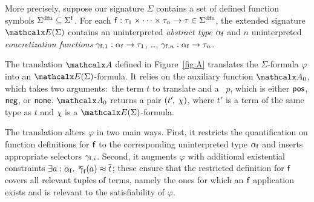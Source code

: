 More precisely,
suppose our signature $\Sigma$ contains a set of defined function symbols $\sfundefs{\Sigma} \subseteq \sfuns{\Sigma}$.
For each $\con{f} : \tau_1 \times \cdots \times \tau_n \rightarrow \tau \in \sfundefs{\Sigma}$,
the extended signature $\extendsig{\Sigma}$ contains
an uninterpreted \emph{abstract type} $\alpha_{\mathsf{f}}$ and
$n$ uninterpreted \emph{concretization functions} $\gamma_{\mathsf{f},1} : \alpha_{\mathsf{f}} \rightarrow \tau_1$, \ldots, $\gamma_{\mathsf{f},n} : \alpha_{\mathsf{f}} \rightarrow \tau_n$.

The translation $\conv$ defined in Figure~\ref{fig:A} translates the $\Sigma$-formula
$\varphi$ into an $\extendsig{\Sigma}$-formula. It relies
on the auxiliary function $\conv_0$, which takes two arguments:\ the term $t$
to translate and a ~$p$, which is either $\mathsf{pos}$, $\mathsf{neg}$, or
$\mathsf{none}$. \vthinspace$\conv_0$ returns a pair $( t'\negvthinspace,\, \chi )$, where $t'$ is a term of
the same type as $t$ and $\chi$ is a $\extendsig{\Sigma}$-formula.



The translation alters $\varphi$ in two main ways. First, it restricts the
quantification on function definitions for $\mathsf{f}$ to the corresponding
uninterpreted type $\alpha_{\mathsf{f}}$ and inserts appropriate selectors
$\gamma_{\mathsf{f},i}$. Second, it augments $\varphi$ with additional existential
constraints
$\exists a : \alpha_{\mathsf{f}}.\;\, \overline{\gamma}_{\mathsf{f}}( a ) \approx \overline{t}$; these
ensure that the restricted definition for $\mathsf{f}$ covers all relevant tuples
of terms, namely the ones for which an $\mathsf{f}$ application exists and is
relevant to the satisfiability of $\varphi$.

